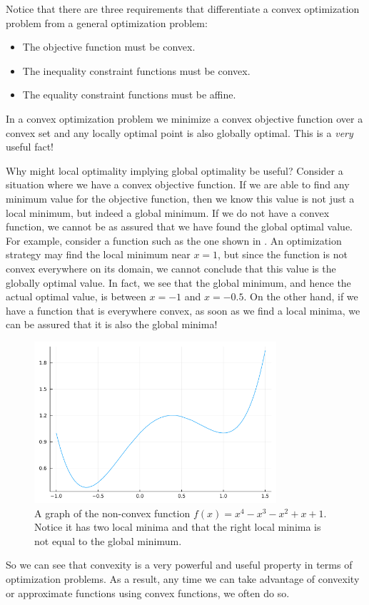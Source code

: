 Notice that there are three requirements that differentiate a convex optimization problem from a general optimization problem:
\begin{itemize}
	\item The objective function must be convex.
	\item The inequality constraint functions must be convex.
	\item The equality constraint functions must be affine.
\end{itemize}

In a convex optimization problem we minimize a convex objective function over a convex set and any locally optimal point is also globally optimal. This is a \textit{very} useful fact!

Why might local optimality implying global optimality be useful? Consider a situation where we have a convex objective function. If we are able to find any minimum value for the objective function, then we know this value is not just a local minimum, but indeed a global minimum. If we do not have a convex function, we cannot be as assured that we have found the global optimal value. For example, consider a function such as the one shown in . An optimization strategy may find the local minimum near $x=1$, but since the function is not convex everywhere on its domain, we cannot conclude that this value is the globally optimal value. In fact, we see that the global minimum, and hence the actual optimal value, is between $x=-1$ and $x=-0.5$. On the other hand, if we have a function that is everywhere convex, as soon as we find a local minima, we can be assured that it is also the global minima!

\begin{figure}
	\centering
	\includegraphics[width=0.8\textwidth]{Chapter_I_Background/Images/Non-Convex-Example.png}
	\caption[A Non-Convex Function]{A graph of the non-convex function $f(x)=x^4-x^3-x^2+x+1$. Notice it has two local minima and that the right local minima is not equal to the global minimum.}
	\label{fig:non-convex-function-example}
\end{figure}

So we can see that convexity is a very powerful and useful property in terms of optimization problems. As a result, any time we can take advantage of convexity or approximate functions using convex functions, we often do so.